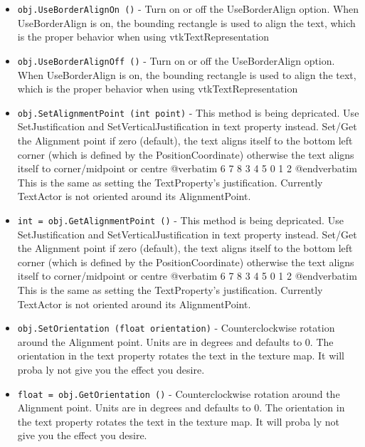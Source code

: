 \begin{itemize}
\item  \verb|obj.UseBorderAlignOn ()| -  Turn on or off the UseBorderAlign option.
 When UseBorderAlign is on, the bounding rectangle is used to align the text,
 which is the proper behavior when using vtkTextRepresentation

\item  \verb|obj.UseBorderAlignOff ()| -  Turn on or off the UseBorderAlign option.
 When UseBorderAlign is on, the bounding rectangle is used to align the text,
 which is the proper behavior when using vtkTextRepresentation

\item  \verb|obj.SetAlignmentPoint (int point)| -  This method is being depricated.  Use SetJustification and
 SetVerticalJustification in text property instead.
 Set/Get the Alignment point
 if zero (default), the text aligns itself to the bottom left corner
 (which is defined by the PositionCoordinate)
 otherwise the text aligns itself to corner/midpoint or centre
 @verbatim
      6   7   8
      3   4   5
      0   1   2
 @endverbatim
 This is the same as setting the TextProperty's justification.
 Currently TextActor is not oriented around its AlignmentPoint.

\item  \verb|int = obj.GetAlignmentPoint ()| -  This method is being depricated.  Use SetJustification and
 SetVerticalJustification in text property instead.
 Set/Get the Alignment point
 if zero (default), the text aligns itself to the bottom left corner
 (which is defined by the PositionCoordinate)
 otherwise the text aligns itself to corner/midpoint or centre
 @verbatim
      6   7   8
      3   4   5
      0   1   2
 @endverbatim
 This is the same as setting the TextProperty's justification.
 Currently TextActor is not oriented around its AlignmentPoint.

\item  \verb|obj.SetOrientation (float orientation)| -  Counterclockwise rotation around the Alignment point.  
 Units are in degrees and defaults to 0.
 The orientation in the text property rotates the text in the 
 texture map.  It will proba ly not give you the effect you
 desire.

\item  \verb|float = obj.GetOrientation ()| -  Counterclockwise rotation around the Alignment point.  
 Units are in degrees and defaults to 0.
 The orientation in the text property rotates the text in the 
 texture map.  It will proba ly not give you the effect you
 desire.


\end{itemize}
